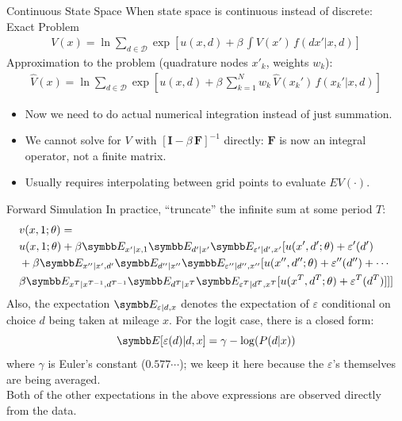 \documentclass[aspectratio=169,11pt]{beamer}
\begin{document}
\begin{frame}{Continuous State Space}
When state space is continuous instead of discrete:\\
Exact Problem
\begin{align*}
V(x) = \ln \sum_{d \in \mathcal{D}} \exp\left[ u(x,d) + \beta \, \int V(x')\, f(dx' | x,d) \right]
\end{align*}
Approximation to the problem (quadrature nodes $x'_k$, weights $w_k$):
\begin{align*}
\hat{V}(x) = \ln \sum_{d \in \mathcal{D}} \exp\left[ u(x,d) + \beta \, \sum_{k=1}^N w_k \, \hat{V}(x_k') \, f (x_k' | x,d) \right]
\end{align*}
\begin{itemize}
\item Now we need to do actual numerical integration instead of just summation.
\item We cannot solve for $V$ with $[\symbf{I}- \beta \, \symbf{F}]^{-1}$ directly: $\symbf{F}$ is now an integral operator, not a finite matrix.
\item Usually requires interpolating between grid points to evaluate $EV(\cdot)$.
\end{itemize}
\end{frame}


\begin{frame}{Forward Simulation}
In practice, ``truncate'' the infinite sum at some period $T$:
\begin{align*}
& v(x, 1;\theta) =\\
& u(x, 1; \theta) + \beta \E_{x'|x, 1} \E_{d'|x'} \E_{\varepsilon'|d', x'} [u(x', d';\theta) + \varepsilon'(d') \\
& + \beta \E_{x''|x', d'} \E_{d''|x''} \E_{\varepsilon''|d'', x''} [u(x'', d'';\theta) + \varepsilon''(d'') + \cdots \\
& \beta \E_{x^T|x^{T-1}, d^{T-1}} \E_{d^T|x^T} \E_{\varepsilon^T|d^T, x^T} [u(x^T, d^T;\theta) + \varepsilon^T(d^T) ]]]
\end{align*}
Also, the expectation $\E_{\varepsilon|d, x}$ denotes the expectation of $\varepsilon$ conditional on choice $d$ being taken at mileage $x$. For the logit case, there is a closed form:
$$ \E[\varepsilon(d) | d, x] = \gamma - \log(P(d|x))$$
where $\gamma$ is Euler's constant ($0.577\cdots$); we keep it here because the $\varepsilon$'s themselves are being averaged. \\
\vspace{2mm}
Both of the other expectations in the above expressions are observed directly from the data.
\end{frame}
\end{document}
